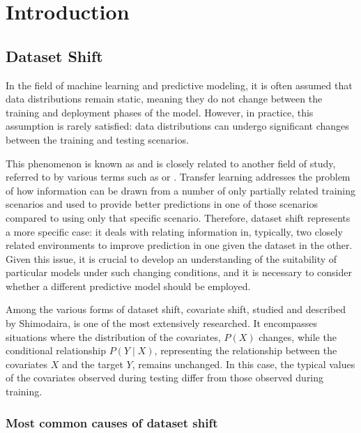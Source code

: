 \chapter{Introduction}

\section{Dataset Shift}


In the field of machine learning and predictive modeling, it is often assumed that data distributions remain static, meaning they do not change between the training and deployment phases of the model. However, in practice, this assumption is rarely satisfied: data distributions can undergo significant changes between the training and testing scenarios.

This phenomenon is known as \cite{shiftbook} and is closely related to another field of study, referred to by various terms such as  or . Transfer learning addresses the problem of how information can be drawn from a number of only partially related training scenarios and used to provide better predictions in one of those scenarios compared to using only that specific scenario. Therefore, dataset shift represents a more specific case: it deals with relating information in, typically, two closely related environments to improve prediction in one given the dataset in the other. Given this issue, it is crucial to develop an understanding of the suitability of particular models under such changing conditions, and it is necessary to consider whether a different predictive model should be employed.

Among the various forms of dataset shift, covariate shift, studied and described by Shimodaira\cite{SHIMODAIRA2000227}, is one of the most extensively researched. It encompasses situations where the distribution of the covariates, $P(X)$ changes, while the conditional relationship $P(Y \mid X)$, representing the relationship between the covariates $X$ and the target $Y$, remains unchanged. In this case, the typical values of the covariates observed during testing differ from those observed during training.

	
\subsection{Most common causes of dataset shift}
	
